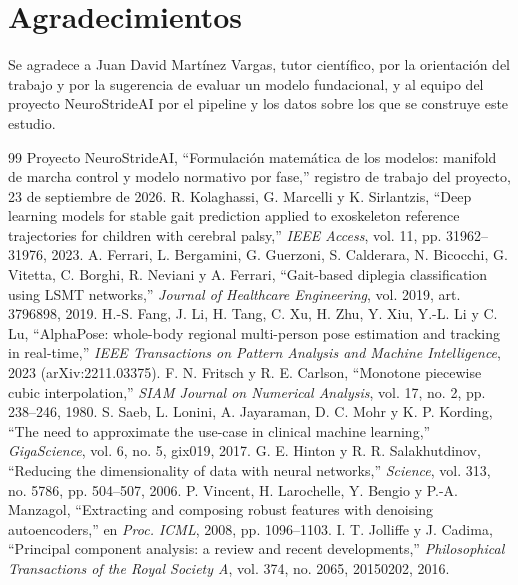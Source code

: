 \documentclass[11pt,a4paper]{amsart}
\begin{document}
\section*{Agradecimientos}

Se agradece a Juan David Martínez Vargas, tutor científico, por la orientación del trabajo y por la sugerencia de evaluar un modelo fundacional, y al equipo del proyecto NeuroStrideAI por el pipeline y los datos sobre los que se construye este estudio.

\begin{thebibliography}{99}
\small
{} Proyecto NeuroStrideAI, ``Formulación matemática de los modelos: manifold de marcha control y modelo normativo por fase,'' registro de trabajo del proyecto, 23 de septiembre de 2026.
 R. Kolaghassi, G. Marcelli y K. Sirlantzis, ``Deep learning models for stable gait prediction applied to exoskeleton reference trajectories for children with cerebral palsy,'' \emph{IEEE Access}, vol. 11, pp. 31962--31976, 2023.
 A. Ferrari, L. Bergamini, G. Guerzoni, S. Calderara, N. Bicocchi, G. Vitetta, C. Borghi, R. Neviani y A. Ferrari, ``Gait-based diplegia classification using LSMT networks,'' \emph{Journal of Healthcare Engineering}, vol. 2019, art. 3796898, 2019.
 H.-S. Fang, J. Li, H. Tang, C. Xu, H. Zhu, Y. Xiu, Y.-L. Li y C. Lu, ``AlphaPose: whole-body regional multi-person pose estimation and tracking in real-time,'' \emph{IEEE Transactions on Pattern Analysis and Machine Intelligence}, 2023 (arXiv:2211.03375).
 F. N. Fritsch y R. E. Carlson, ``Monotone piecewise cubic interpolation,'' \emph{SIAM Journal on Numerical Analysis}, vol. 17, no. 2, pp. 238--246, 1980.
 S. Saeb, L. Lonini, A. Jayaraman, D. C. Mohr y K. P. Kording, ``The need to approximate the use-case in clinical machine learning,'' \emph{GigaScience}, vol. 6, no. 5, gix019, 2017.
 G. E. Hinton y R. R. Salakhutdinov, ``Reducing the dimensionality of data with neural networks,'' \emph{Science}, vol. 313, no. 5786, pp. 504--507, 2006.
 P. Vincent, H. Larochelle, Y. Bengio y P.-A. Manzagol, ``Extracting and composing robust features with denoising autoencoders,'' en \emph{Proc. ICML}, 2008, pp. 1096--1103.
 I. T. Jolliffe y J. Cadima, ``Principal component analysis: a review and recent developments,'' \emph{Philosophical Transactions of the Royal Society A}, vol. 374, no. 2065, 20150202, 2016.

\end{thebibliography}
\end{document}
